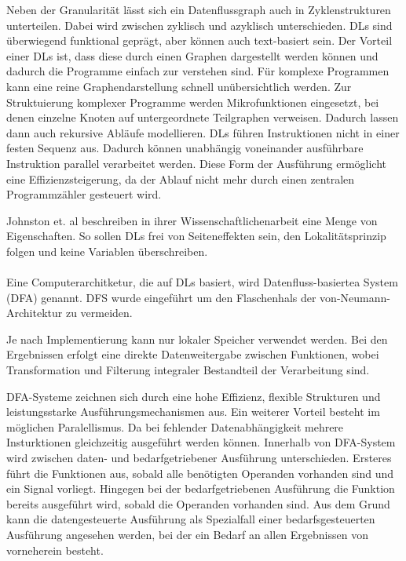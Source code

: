 \documentclass{article}
\begin{document}
    Neben der Granularität lässt sich ein Datenflussgraph auch in Zyklenstrukturen unterteilen. 
    Dabei wird zwischen zyklisch und azyklisch unterschieden. \cite{8} %
    DLs sind überwiegend funktional geprägt, aber können auch text-basiert sein. \cite{2}
    Der Vorteil einer DLs ist, dass diese durch einen Graphen dargestellt werden können \cite{11} und dadurch die Programme einfach zur verstehen sind. \cite{6}
    Für komplexe Programmen kann eine reine Graphendarstellung schnell unübersichtlich werden. Zur Struktuierung komplexer Programme werden Mikrofunktionen eingesetzt, bei denen einzelne Knoten auf untergeordnete Teilgraphen verweisen. Dadurch lassen dann auch rekursive Abläufe modellieren. \cite{11}    
    DLs führen Instruktionen nicht in einer festen Sequenz aus. Dadurch können unabhängig voneinander ausführbare Instruktion parallel verarbeitet werden. \cite{1}
    Diese Form der Ausführung ermöglicht eine Effizienzsteigerung, da der Ablauf nicht mehr durch einen zentralen Programmzähler gesteuert wird. \cite{2}

    Johnston et. al beschreiben in ihrer Wissenschaftlichenarbeit eine Menge von Eigenschaften. So sollen DLs frei von Seiteneffekten sein, den Lokalitätsprinzip folgen und keine Variablen überschreiben.\cite{2}\\
    \\
    Eine Computerarchitketur, die auf DLs basiert, wird Datenfluss-basiertea System (DFA) genannt.
    DFS wurde eingeführt um den Flaschenhals der von-Neumann-Architektur zu vermeiden. \cite{8} %

    Je nach Implementierung kann nur lokaler Speicher verwendet werden. \cite{8}
    Bei den Ergebnissen erfolgt eine direkte Datenweitergabe zwischen Funktionen, wobei Transformation und Filterung integraler Bestandteil der Verarbeitung sind. \cite{15}

    DFA-Systeme zeichnen sich durch eine hohe Effizienz, flexible Strukturen und leistungsstarke Ausführungsmechanismen aus. \cite{1}
    Ein weiterer Vorteil besteht im möglichen Paralellismus. Da bei fehlender Datenabhängigkeit mehrere Insturktionen gleichzeitig ausgeführt werden können. \cite{1}
    Innerhalb von DFA-System wird zwischen daten- und bedarfgetriebener Ausführung unterschieden. Ersteres führt die Funktionen aus, sobald alle benötigten Operanden vorhanden sind und ein Signal vorliegt. Hingegen bei der bedarfgetriebenen Ausführung die Funktion bereits ausgeführt wird, sobald die Operanden vorhanden sind. \cite{2}
    Aus dem Grund kann die datengesteuerte Ausführung als Spezialfall einer bedarfsgesteuerten Ausführung angesehen werden, bei der ein Bedarf an allen Ergebnissen von vorneherein besteht. \cite{11}
    \newpage
\end{document}
